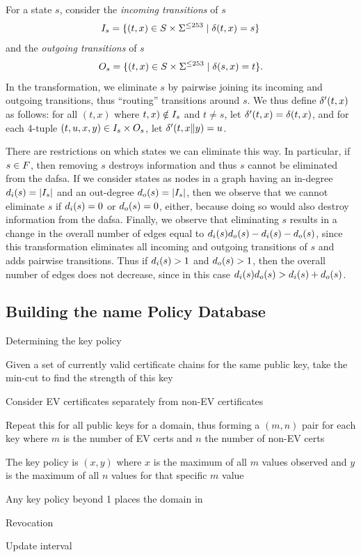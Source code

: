 For a state $s$, consider the \emph{incoming transitions} of $s$
\begin{equation*}
  I_{s} = \{(t, x) \in S \times \Sigma^{\le 253} \mid \delta(t, x)
  = s\}
\end{equation*}
and the \emph{outgoing transitions} of $s$
\begin{equation*}
  O_{s} = \{(t, x) \in S \times \Sigma^{\le 253} \mid \delta(s,
  x) = t\}.
\end{equation*}
In the transformation, we eliminate $s$ by pairwise joining its incoming and
outgoing transitions, thus ``routing'' transitions around $s$. We thus define
$\delta'(t, x)$ as follows: for all $(t, x)$ where $t, x) \notin
I_{s}$ and $t \ne s$, let $\delta'(t, x) = \delta(t, x)$, and for
each 4-tuple $(t, u, x, y) \in I_{s} \times O_{s}$, let
$\delta'(t, x \| y) = u$.

There are restrictions on which states we can eliminate this way. In particular,
if $s \in F$, then removing $s$ destroys information and thus $s$
cannot be eliminated from the \ac{dafsa}. If we consider states as nodes in a
graph having an in-degree $d_i(s) = |I_{s}|$ and an out-degree
$d_o(s) = |I_{s}|$, then we observe that we cannot eliminate $s$ if
$d_i(s) = 0$ or $d_o(s) = 0$, either, because doing so would also
destroy information from the \ac{dafsa}. Finally, we observe that eliminating
$s$ results in a change in the overall number of edges equal to
$d_i(s)d_o(s) - d_i(s) - d_o(s)$, since this
transformation eliminates all incoming and outgoing transitions of $s$ and adds
pairwise transitions. Thus if $d_i(s) > 1$ and $d_o(s) > 1$, then
the overall number of edges does not decrease, since in this case
$d_i(s)d_o(s) > d_i(s) + d_o(s)$.


\subsection{Building the \ac{name} Policy Database}
\label{sec:design:policy}

Determining the key policy
\begin{compactitem}
\item Given a set of currently valid certificate chains for the same public key,
  take the min-cut to find the strength of this key
\item Consider EV certificates separately from non-EV certificates
\item Repeat this for all public keys for a domain, thus forming a $(m, n)$ pair
  for each key where $m$ is the number of EV certs and $n$ the number of
  non-EV certs
\item The key policy is $(x, y)$ where $x$ is the maximum of all $m$ values
  observed and $y$ is the maximum of all $n$ values for that specific $m$ value
\item Any key policy beyond 1 places the domain in \multicertset
\item Revocation
\item Update interval
\end{compactitem}

